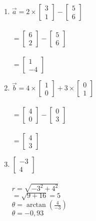 \documentclass[a4paper]{article}
\begin{document}
    \begin{enumerate}[1.]
        \item $\overrightarrow{a} = 2 \times \begin{bmatrix}3 \\ 1 \end{bmatrix} - \begin{bmatrix}5 \\ 6\end{bmatrix}$\\\\
        $=  \begin{bmatrix}6 \\ 2\end{bmatrix} - \begin{bmatrix}5 \\ 6\end{bmatrix}$\\\\
        $= \begin{bmatrix}1 \\ -4\end{bmatrix}$

        \item $\overrightarrow{b} = 4 \times \begin{bmatrix}1 \\ 0 \end{bmatrix} + 3 \times \begin{bmatrix}0 \\ 1\end{bmatrix}$\\\\
        $=  \begin{bmatrix}4 \\ 0\end{bmatrix} - \begin{bmatrix}0 \\ 3\end{bmatrix}$\\\\
        $= \begin{bmatrix}4 \\ 3\end{bmatrix}$

        \item $\begin{bmatrix}-3 \\ 4\end{bmatrix}$\\\\
        $r = \sqrt{-3^2 + 4^2}$\\
        $= \sqrt{9 + 16}= 5$\\
        $\theta = \arctan (\frac{4}{-3})$\\
        $\theta=-0,93$


\end{enumerate}
\end{document}
